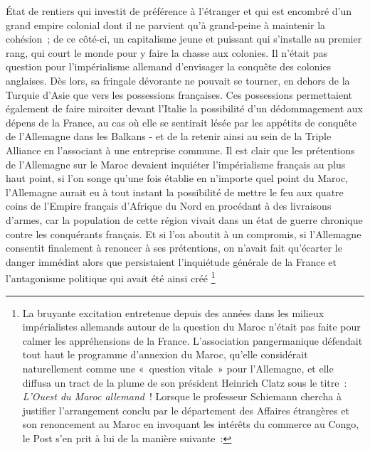 \documentclass[french,twoside]{book} %
\begin{document}
État de rentiers qui investit de préférence à l’étranger et qui est encombré d’un grand empire colonial dont il ne parvient qu’à grand-peine à maintenir la cohésion ; de ce côté-ci, un capitalisme jeune et puissant qui s’installe au premier rang, qui court le monde pour y faire la chasse aux colonies. Il n’était pas question pour l’impérialisme allemand d’envisager la conquête des colonies anglaises. Dès lors, sa fringale dévorante ne pouvait se tourner, en dehors de la Turquie d’Asie que vers les possessions françaises. Ces possessions permettaient également de faire miroiter devant l’Italie la possibilité d’un dédommagement aux dépens de la France, au cas où elle se sentirait lésée par les appétits de conquête de l’Allemagne dans les Balkans - et de la retenir ainsi au sein de la Triple Alliance en l’associant à une entreprise commune. Il est clair que les prétentions de l’Allemagne sur le Maroc devaient inquiéter l’impérialisme français au plus haut point, si l’on songe qu’une fois établie en n’importe quel point du Maroc, l’Allemagne aurait eu à tout instant la possibilité de mettre le feu aux quatre coins de l’Empire français d’Afrique du Nord en procédant à des livraisons d’armes, car la population de cette région vivait dans un état de guerre chronique contre les conquérants français. Et si l’on aboutit à un compromis, si l’Allemagne consentit finalement à renoncer à ses prétentions, on n’avait fait qu’écarter le danger immédiat alors que persistaient l’inquiétude générale de la France et l’antagonisme politique qui avait été ainsi créé \footnote{ \noindent La bruyante excitation entretenue depuis des années dans les milieux impérialistes allemands autour de la question du Maroc n’était pas faite pour calmer les appréhensions de la France. L'association pangermanique défendait tout haut le programme d’annexion du Maroc, qu’elle considérait naturellement comme une « question vitale » pour l’Allemagne, et elle diffusa un tract de la plume de son président Heinrich Clatz sous le titre : \emph{L'Ouest du Maroc allemand} ! Lorsque le professeur Schiemann chercha à justifier l’arrangement conclu par le département des Affaires étrangères et son renoncement au Maroc en invoquant les intérêts du commerce au Congo, le Post s’en prit à lui de la manière suivante :\par
}
\end{document}
